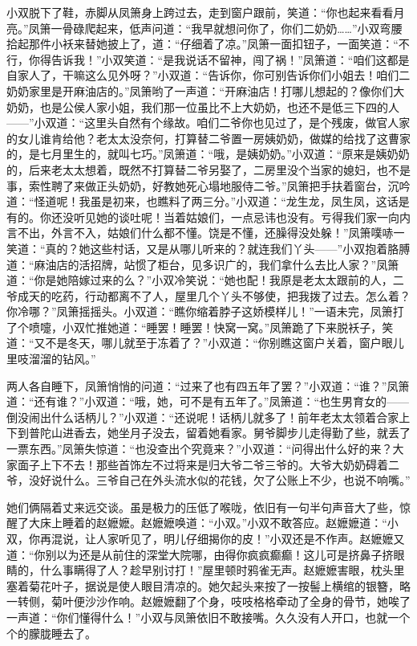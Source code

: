 \par 小双脱下了鞋，赤脚从凤箫身上跨过去，走到窗户跟前，笑道：“你也起来看看月亮。”凤箫一骨碌爬起来，低声问道：“我早就想问你了，你们二奶奶……”小双弯腰拾起那件小袄来替她披上了，道：“仔细着了凉。”凤箫一面扣钮子，一面笑道：“不行，你得告诉我！”小双笑道：“是我说话不留神，闯了祸！”凤箫道：“咱们这都是自家人了，干嘛这么见外呀？”小双道：“告诉你，你可别告诉你们小姐去！咱们二奶奶家里是开麻油店的。”凤箫哟了一声道：“开麻油店！打哪儿想起的？像你们大奶奶，也是公侯人家小姐，我们那一位虽比不上大奶奶，也还不是低三下四的人——”小双道：“这里头自然有个缘故。咱们二爷你也见过了，是个残废，做官人家的女儿谁肯给他？老太太没奈何，打算替二爷置一房姨奶奶，做媒的给找了这曹家的，是七月里生的，就叫七巧。”凤箫道：“哦，是姨奶奶。”小双道：“原来是姨奶奶的，后来老太太想着，既然不打算替二爷另娶了，二房里没个当家的媳妇，也不是事，索性聘了来做正头奶奶，好教她死心塌地服侍二爷。”凤箫把手扶着窗台，沉吟道：“怪道呢！我虽是初来，也瞧料了两三分。”小双道：“龙生龙，凤生凤，这话是有的。你还没听见她的谈吐呢！当着姑娘们，一点忌讳也没有。亏得我们家一向内言不出，外言不入，姑娘们什么都不懂。饶是不懂，还臊得没处躲！”凤箫噗哧一笑道：“真的？她这些村话，又是从哪儿听来的？就连我们丫头——”小双抱着胳膊道：“麻油店的活招牌，站惯了柜台，见多识广的，我们拿什么去比人家？”凤箫道：“你是她陪嫁过来的么？”小双冷笑说：“她也配！我原是老太太跟前的人，二爷成天的吃药，行动都离不了人，屋里几个丫头不够使，把我拨了过去。怎么着？你冷哪？”凤箫摇摇头。小双道：“瞧你缩着脖子这娇模样儿！”一语未完，凤箫打了个喷嚏，小双忙推她道：“睡罢！睡罢！快窝一窝。”凤箫跪了下来脱袄子，笑道：“又不是冬天，哪儿就至于冻着了？”小双道：“你别瞧这窗户关着，窗户眼儿里吱溜溜的钻风。”
\par 两人各自睡下，凤箫悄悄的问道：“过来了也有四五年了罢？”小双道：“谁？”凤箫道：“还有谁？”小双道：“哦，她，可不是有五年了。”凤箫道：“也生男育女的——倒没闹出什么话柄儿？”小双道：“还说呢！话柄儿就多了！前年老太太领着合家上下到普陀山进香去，她坐月子没去，留着她看家。舅爷脚步儿走得勤了些，就丢了一票东西。”凤箫失惊道：“也没查出个究竟来？”小双道：“问得出什么好的来？大家面子上下不去！那些首饰左不过将来是归大爷二爷三爷的。大爷大奶奶碍着二爷，没好说什么。三爷自己在外头流水似的花钱，欠了公账上不少，也说不响嘴。”
\par 她们俩隔着丈来远交谈。虽是极力的压低了喉咙，依旧有一句半句声音大了些，惊醒了大床上睡着的赵嬷嬷。赵嬷嬷唤道：“小双。”小双不敢答应。赵嬷嬷道：“小双，你再混说，让人家听见了，明儿仔细揭你的皮！”小双还是不作声。赵嬷嬷又道：“你别以为还是从前住的深堂大院哪，由得你疯疯癫癫！这儿可是挤鼻子挤眼睛的，什么事瞒得了人？趁早别讨打！”屋里顿时鸦雀无声。赵嬷嬷害眼，枕头里塞着菊花叶子，据说是使人眼目清凉的。她欠起头来按了一按髻上横绾的银簪，略一转侧，菊叶便沙沙作响。赵嬷嬷翻了个身，吱吱格格牵动了全身的骨节，她唉了一声道：“你们懂得什么！”小双与凤箫依旧不敢接嘴。久久没有人开口，也就一个个的朦胧睡去了。
